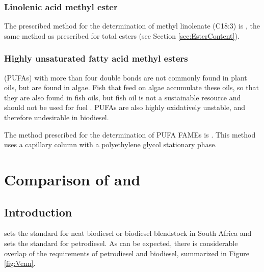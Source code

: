 \subsubsection{Linolenic acid methyl ester}

The prescribed method for the determination of methyl linolenate (C18:3) is
, the same method as prescribed for total esters (see Section
\ref{sec:EsterContent}).

\subsubsection{Highly unsaturated fatty acid methyl esters}
\label{sec:PUFA}

 (PUFAs) with more than four double bonds are
not commonly found in plant oils, but are found in algae. Fish that feed on
algae accumulate these oils, so that they are also found in fish oils, but fish
oil is not a sustainable resource and should not be used for fuel
\autocite{Kitessa2014}. PUFAs are also highly oxidatively unstable, and
therefore undesirable in biodiesel.

The method prescribed for the determination of PUFA FAMEs is .
This method uses a capillary column with a polyethylene glycol stationary phase.

\section{Comparison of \texorpdfstring{}{SANS 1935} and \texorpdfstring{}{SANS 342}}

\subsection{Introduction}
\label{sec:Comparison}

 sets the standard for neat biodiesel or biodiesel blendstock in
South Africa and  sets the standard for petrodiesel. As can be
expected, there is considerable overlap of the requirements of petrodiesel and
biodiesel, summarized in Figure \ref{fig:Venn}.


